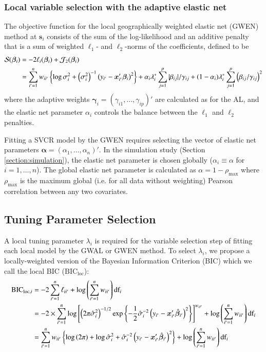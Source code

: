 \documentclass[authoryear, review, 11pt]{elsarticle}
\begin{document}
	\subsubsection{Local variable selection with the adaptive elastic net}
	The objective function for the local geographically weighted elastic net (GWEN) method at $\bm{s}_i$ consists of the sum of the log-likelihood and an additive penalty that is a sum of weighted $\ell_1$- and $\ell_2$-norms of the coefficients, defined to be
	\begin{align}
		\mathcal{S}(\bm{\beta}_i) &= -2 \ell_i(\bm{\beta}_i) + \mathcal{J}_2(\bm{\beta}_i) \notag \\
		&= \sum_{i'=1}^n w_{ii'}  \left\{ \log{\sigma^2_i}  + \left(\sigma^2_i\right)^{-1}  \left(y_{i'} - \bm{x}'_{i'} \bm{\beta}_i \right)^2 \right\} + \alpha_i \lambda^*_i \sum_{j=1}^p |\beta_{ij}| / \gamma_{ij} + (1-\alpha_i) \lambda^*_i \sum_{j=1}^p  \left( \beta_{ij} / \gamma_{ij} \right)^2
	\end{align}	
	where the adaptive weights $\bm{\gamma}_i = \left(\gamma_{i1}, \dots, \gamma_{ip}\right)'$ are calculated as for the AL, and the elastic net parameter $\alpha_i$ controls the balance between the $\ell_1$ and $\ell_2$ penalties.
	
	Fitting a SVCR model by the GWEN requires selecting the vector of elastic net parameters $\bm{\alpha} = \left( \alpha_1, \dots, \alpha_n \right)'$. In the simulation study (Section \ref{section:simulation}), the elastic net parameter is chosen globally ($\alpha_i \equiv \alpha$ for $i=1, \dots, n$). The global elastic net parameter is calculated as $\alpha = 1-\rho_{\text{max}}$ where $\rho_{\text{max}}$ is the maximum global (i.e. for all data without weighting) Pearson correlation between any two covariates.

	\subsection{Tuning Parameter Selection}	
	A local tuning parameter $\lambda_i$ is required for the variable selection step of fitting each local model by the GWAL or GWEN method. To select $\lambda_i$, we propose a locally-weighted version of the Bayesian Information Criterion (BIC) \citep{Schwarz-1978} which we call the local BIC ($\text{BIC}_{\text{loc}}$):
	\begin{align}\label{eq:BIC_loc}
		\mbox{BIC}_{\text{loc}, i} &= -2 \sum_{i'=1}^n \ell_{ii'}  + \log \left( \sum_{i'=1}^n w_{ii'} \right) \mbox{df}_i\notag\\
		&= -2 \times \sum_{i'=1}^n \log \left[ \left(2 \pi \hat{\sigma}_i^2\right)^{-1/2} \exp \left\{-\frac{1}{2} \hat{\sigma}_i^{-2} \left(y_{i'} - \bm{x}_{i'}' \hat{\bm{\beta}}_{i'} \right)^2\right\} \right]^{w_{ii'}} + \log \left( \sum_{i'=1}^n w_{ii'} \right) \mbox{df}_i\notag\\
		&= \sum_{i'=1}^n w_{ii'} \left\{ \log \left(2 \pi \right) + \log \hat{\sigma}_i^2 + \hat{\sigma}_i^{-2} \left(y_{i'} - \bm{x}_{i'}' \hat{\bm{\beta}}_{i'} \right)^2 \right\} + \log \left( \sum_{i'=1}^n w_{ii'} \right) \mbox{df}_i
	\end{align}
	
\end{document}

